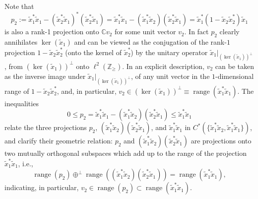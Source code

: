 Note that
\[
p_{2}:=\tilde{x}_{1}^{\ast}\tilde{x}_{1}- ( \tilde{x}_{2}^{\ast}\tilde
{x}_{1} ) ^{\ast} ( \tilde{x}_{2}^{\ast}\tilde{x}_{1} )
=\tilde{x}_{1}^{\ast}\tilde{x}_{1}- ( \tilde{x}_{1}^{\ast}\tilde{x}%
_{2} ) ( \tilde{x}_{2}^{\ast}\tilde{x}_{1} ) =\tilde{x}%
_{1}^{\ast} ( 1-\tilde{x}_{2}\tilde{x}_{2}^{\ast} ) \tilde{x}_{1}%
\]
is also a rank-1 projection onto $\mathbb{C}v_{2}$ for some unit vector
$v_{2}$. In fact $p_{2}$ clearly annihilates $\ker ( \tilde{x}_{1} )
$ and can be viewed as the conjugation of the rank-$1$ projection $1-\tilde{x}_{2}\tilde{x}_{2}%
^{\ast}$ (onto the kernel of $\tilde{x}_{2}^{\ast}$) by the unitary
operator $\tilde{x}_{1}|_{( \ker( \tilde{x}_{1}))
^{\perp}}$, from $( \ker( \tilde{x}_{1})) ^{\perp}$
onto $\ell^{2}( \mathbb{Z}_{\geq}) $. In an explicit description, $v_{2}$
can be taken as the inverse image under $\tilde{x}_{1}|_{( \ker( \tilde{x}_{1})) ^{\perp}}$,
of any unit vector in the $1$-dimensional range of $1-\tilde{x}_{2}\tilde{x}%
_{2}^{\ast}$, and, in particular, $v_{2}\in( \ker( \tilde{x}
_{1})) ^{\perp}\equiv\operatorname{range}( \tilde{x}_{1}^{\ast}\tilde{x}_{1})$.
The inequalities
\[
0\leq p_{2}=\tilde{x}_{1}^{\ast}\tilde{x}_{1}-( \tilde{x}_{1}^{\ast
}\tilde{x}_{2}) ( \tilde{x}_{2}^{\ast}\tilde{x}_{1})
\leq\tilde{x}_{1}^{\ast}\tilde{x}_{1}
\]
relate the three projections $p_{2}$, $( \tilde{x}_{1}^{\ast}
\tilde{x}_{2}) ( \tilde{x}_{2}^{\ast}\tilde{x}_{1}) $, and
$\tilde{x}_{1}^{\ast}\tilde{x}_{1}$ in $C^{\ast}(\{ \tilde{x}
_{1}^{\ast}\tilde{x}_{2},\tilde{x}_{1}^{\ast}\tilde{x}_{1}\})
$, and clarify their geometric relation: $p_{2}$ and $( \tilde
{x}_{1}^{\ast}\tilde{x}_{2}) ( \tilde{x}_{2}^{\ast}\tilde{x}%
_{1}) $ are projections onto two mutually orthogonal subspaces which
add up to the range of the projection $\tilde{x}_{1}^{\ast}\tilde{x}_{1}$,
i.e.,
\[
\operatorname{range}( p_{2}) \oplus^{\perp}\operatorname{range}%
(( \tilde{x}_{1}^{\ast}\tilde{x}_{2}) ( \tilde
{x}_{2}^{\ast}\tilde{x}_{1})) =\operatorname{range}(
\tilde{x}_{1}^{\ast}\tilde{x}_{1}) ,
\]
indicating, in particular, $v_{2}\in\operatorname{range}( p_{2})
\subset\operatorname{range}( \tilde{x}_{1}^{\ast}\tilde{x}_{1})$.

